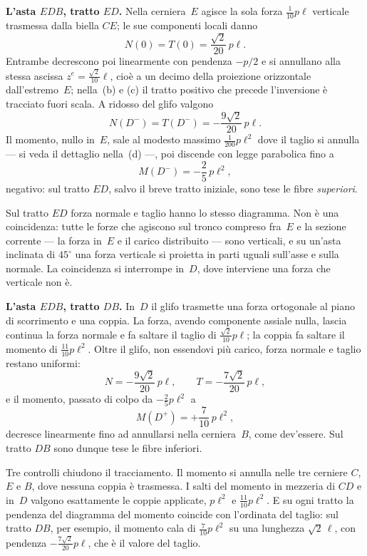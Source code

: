 \begin{esercizio}
\begin{svolgimento}
		\medskip\noindent\textbf{L'asta $EDB$, tratto $ED$.}
		Nella cerniera~$E$ agisce la sola forza $\tfrac{1}{10}p\ell$
		verticale trasmessa dalla biella $CE$; le sue componenti locali
		danno
		\[
		N(0) = T(0) = \frac{\sqrt2}{20}\,p\ell.
		\]
		Entrambe decrescono poi linearmente con pendenza $-p/2$  e 
		si annullano alla stessa ascissa $z^e = \tfrac{\sqrt2}{10}\ell$,
		cioè a un decimo della proiezione orizzontale dall'estremo~$E$; nella
		\,(b) e (c) il tratto positivo che
		precede l'inversione è tracciato fuori scala.	A ridosso del glifo valgono
		\[
		N(D^-) = T(D^-) = -\frac{9\sqrt2}{20}\,p\ell.
		\]
		Il momento, nullo in~$E$, sale al modesto massimo
		$\tfrac{1}{200}p\ell^{2}$ dove il taglio si annulla --- si veda il
		dettaglio nella \,(d) ---, poi discende
		con legge parabolica fino a
		\[
		M(D^-) = -\frac{2}{5}\,p\ell^{2} ,
		\]
		negativo: sul tratto $ED$, salvo il breve tratto iniziale, sono
		tese le fibre \emph{superiori}.
		
		\begin{oss}
			Sul tratto $ED$ forza normale e taglio hanno lo stesso
			diagramma. Non è una coincidenza: tutte le forze che agiscono
			sul tronco compreso fra~$E$ e la sezione corrente --- la forza
			in~$E$ e il carico distribuito --- sono verticali, e su un'asta
			inclinata di $45^{\circ}$ una forza verticale si proietta in
			parti uguali sull'asse e sulla normale. La coincidenza si
			interrompe in~$D$, dove interviene una forza che verticale
			non è.
		\end{oss}
		
		\medskip\noindent\textbf{L'asta $EDB$, tratto $DB$.}
		In~$D$ il glifo trasmette una forza ortogonale al piano di
		scorrimento e una coppia. La forza, avendo componente assiale
		nulla, lascia continua la forza normale e fa saltare il taglio di
		$\tfrac{\sqrt2}{10}p\ell$; la coppia fa saltare il momento di
		$\tfrac{11}{10}p\ell^{2}$. Oltre il glifo, non essendovi più
		carico, forza normale e taglio restano uniformi:
		\[
		N = -\frac{9\sqrt2}{20}\,p\ell ,
		\qquad
		T = -\frac{7\sqrt2}{20}\,p\ell ,
		\]
		e il momento, passato di colpo da $-\tfrac{2}{5}p\ell^{2}$ a
		\[
		M(D^+) = +\frac{7}{10}\,p\ell^{2} ,
		\]
		decresce linearmente fino ad annullarsi nella cerniera~$B$, come
		dev'essere. Sul tratto $DB$ sono dunque tese le fibre inferiori.
		
		\begin{oss}
			Tre controlli chiudono il tracciamento. Il momento si annulla
			nelle tre cerniere $C$, $E$ e $B$, dove nessuna coppia è
			trasmessa. I salti del momento in mezzeria di $CD$ e in~$D$
			valgono esattamente le coppie applicate, $p\ell^{2}$ e
			$\tfrac{11}{10}p\ell^{2}$. E su ogni tratto la pendenza del
			diagramma del momento coincide con l'ordinata del taglio:
			sul tratto $DB$, per esempio, il momento cala di
			$\tfrac{7}{10}p\ell^{2}$ su una lunghezza $\sqrt2\,\ell$, con
			pendenza $-\tfrac{7\sqrt2}{20}p\ell$, che è il valore del
			taglio.
		\end{oss}


\end{svolgimento}
\end{esercizio}
